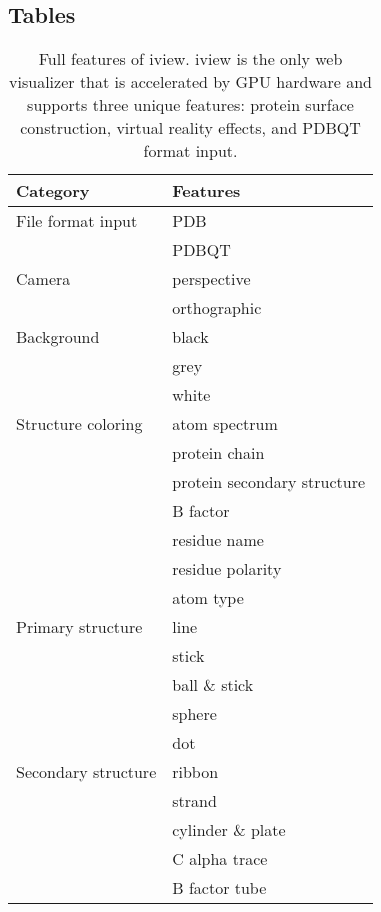 \documentclass[twocolumn]{bmcart}%
\begin{document}
\begin{backmatter}
\section*{Tables}
\begin{table}[h!]
\caption{Full features of iview. iview is the only web visualizer that is accelerated by GPU hardware and supports three unique features: protein surface construction, virtual reality effects, and PDBQT format input.}\label{tbl:features}
      \begin{tabular}{ll}
        \hline
                 Category & Features\\
        \hline
        File format input & PDB\\
                          & PDBQT\\
        \hline
                   Camera & perspective\\
                          & orthographic\\
        \hline
               Background & black\\
                          & grey\\
                          & white\\
        \hline
       Structure coloring & atom spectrum\\
                          & protein chain\\
                          & protein secondary structure\\
                          & B factor\\
                          & residue name\\
                          & residue polarity\\
                          & atom type\\
        \hline
        Primary structure & line\\
                          & stick\\
                          & ball \& stick\\
                          & sphere\\
                          & dot\\
        \hline
      Secondary structure & ribbon\\
                          & strand\\
                          & cylinder \& plate\\
                          & C alpha trace\\
                          & B factor tube\\

\end{tabular}
\end{table}
\end{backmatter}
\end{document}
